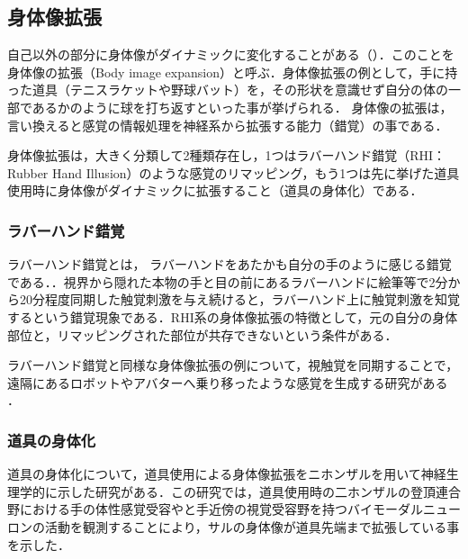 \begin{small}
  \subsection{身体像拡張}


    自己以外の部分に身体像がダイナミックに変化することがある（）．このことを身体像の拡張（Body image expansion）と呼ぶ．身体像拡張の例として，手に持った道具（テニスラケットや野球バット）を，その形状を意識せず自分の体の一部であるかのように球を打ち返すといった事が挙げられる\cite{渡辺貴文2005仮想道具による身体像拡張の評価手法に関する研究}．
    身体像の拡張は，言い換えると感覚の情報処理を神経系から拡張する能力（錯覚）の事である．

    身体像拡張は，大きく分類して2種類存在し，1つはラバーハンド錯覚（RHI：Rubber Hand Illusion）\cite{botvinick1998rubber}のような感覚のリマッピング，もう1つは先に挙げた道具使用時に身体像がダイナミックに拡張すること（道具の身体化）である．

    \subsubsection{ラバーハンド錯覚}

    ラバーハンド錯覚とは， ラバーハンドをあたかも自分の手のように感じる錯覚である．．視界から隠れた本物の手と目の前にあるラバーハンドに絵筆等で2分から20分程度同期した触覚刺激を与え続けると，ラバーハンド上に触覚刺激を知覚するという錯覚現象である．RHI系の身体像拡張の特徴として，元の自分の身体部位と，リマッピングされた部位が共存できないという条件がある．

    ラバーハンド錯覚と同様な身体像拡張の例について，視触覚を同期することで，遠隔にあるロボットやアバターへ乗り移ったような感覚を生成する研究がある
    \cite{tachi2015telexistence}\cite{ehrsson2004s}\cite{slater2008towards}\cite{iwasaki2017research}\cite{petkova2008if}．

  \subsubsection{道具の身体化}
    道具の身体化について，道具使用による身体像拡張をニホンザルを用いて神経生理学的に示した研究がある\cite{iriki1996coding}．この研究では，道具使用時の二ホンザルの登頂連合野における手の体性感覚受容やと手近傍の視覚受容野を持つバイモーダルニューロンの活動を観測することにより，サルの身体像が道具先端まで拡張している事を示した．


\end{small}
